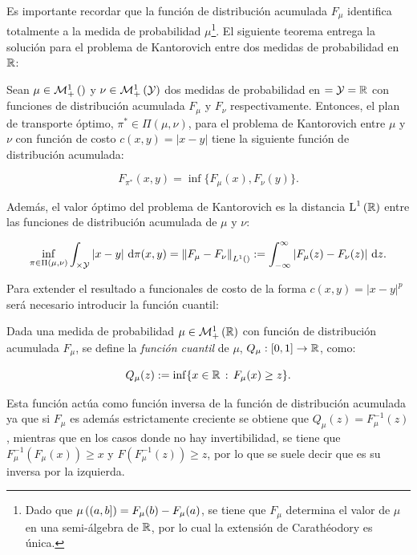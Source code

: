 Es importante recordar que la función de distribución acumulada $F_\mu$ identifica totalmente a la medida de probabilidad $\mu$\footnote{Dado que $\mu\left((a, b]\right) = F_\mu(b) - F_\mu(a)$, se tiene que $F_\mu$ determina el valor de $\mu$ en una semi-álgebra de $\mathbb{R}$, por lo cual la extensión de Carathéodory es única.}. El siguiente teorema entrega la solución para el problema de Kantorovich entre dos medidas de probabilidad en $\mathbb{R}$:

\begin{teo}
	\label{teo:kantorovich_r}
	Sean $\mu\in\mathcal{M}_+^1\left(\right)$ y $\nu\in\mathcal{M}_+^1\left(\mathcal{Y}\right)$ dos medidas de probabilidad en $=\mathcal{Y}=\mathbb{R}$ con funciones de distribución acumulada $F_\mu$ y $F_\nu$ respectivamente. Entonces, el plan de transporte óptimo, $\pi^*\in\Pi(\mu,\nu)$, para el problema de Kantorovich entre $\mu$ y $\nu$ con función de costo $c(x,y)=|x-y|$ tiene la siguiente función de distribución acumulada:

	\begin{equation*}
		F_{\pi^*}(x,y) = \inf \{F_\mu(x),F_\nu(y)\} .
	\end{equation*}

	Además, el valor óptimo del problema de Kantorovich es la distancia $\operatorname{L}^{1}\left(\mathbb{R}\right)$ entre las funciones de distribución acumulada de $\mu$ y $\nu$:

	\begin{equation*}
		\inf_{\pi \in \Pi(\mu,\nu)} \int_{\times\mathcal{Y}} |x-y| \,\operatorname{d}\!\pi(x, y)
		= \left\lVert F_\mu-F_\nu \right\rVert_{L^1()}
		:= \int_{-\infty}^\infty \left|F_\mu(z)-F_\nu(z)\right| \,\operatorname{d}\! z .
	\end{equation*}
\end{teo}

Para extender el resultado a funcionales de costo de la forma $c(x,y)=|x-y|^p$ será necesario introducir la función cuantil: 

\begin{defn}
	Dada una medida de probabilidad $\mu\in\mathcal{M}_+^1\left(\mathbb{R}\right)$ con función de distribución acumulada $F_\mu$, se define la \textit{función cuantil} de $\mu$, $Q_\mu:[0,1]\to\mathbb{R}$, como:

	\begin{equation*}
		Q_\mu(z) := \inf \{x\in\mathbb{R}\,:\, F_\mu(x)\geq z\}.
	\end{equation*}
\end{defn}

Esta función actúa como función inversa de la función de distribución acumulada ya que si $F_\mu$ es además estrictamente creciente se obtiene que $Q_\mu(z) = F_\mu^{-1}(z)$, mientras que en los casos donde no hay invertibilidad, se tiene que $F_\mu^{-1}(F_\mu(x)) \geq x$ y $F(F_\mu^{-1}(z)) \geq z$, por lo que se suele decir que es su inversa por la izquierda.

